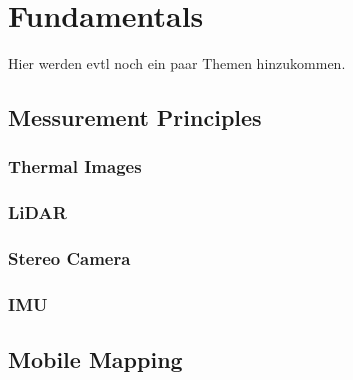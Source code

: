 \chapter{Fundamentals}
Hier werden evtl noch ein paar Themen hinzukommen.
\section{Messurement Principles}
\subsection{Thermal Images}
\subsection{LiDAR}
\subsection{Stereo Camera}
\subsection{IMU}
\section{Mobile Mapping}

